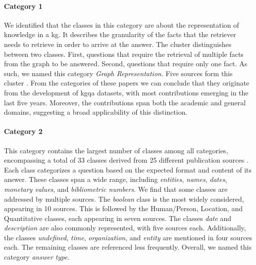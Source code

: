 \label{enum:cluster_1}
\paragraph{Category 1} We identified that the classes in this category are about the representation of knowledge in a \gls{kg}. It describes the granularity of the facts that the retriever needs to retrieve in order to arrive at the answer. The cluster distinguishes between two classes. First, questions that require the retrieval of multiple facts from the graph to be answered. Second, questions that require only one fact. As such, we named this category \emph{Graph Representation}. Five sources form this cluster \cite{banerjee_dblp-quad_2023,auer_sciqa_2023,dubey_lc-quad_2019,jaradeh_question_2020,bordes_large-scale_2015}. From the categories of these papers we can conclude that they originate from the development of \gls{kgqa} datasets, with most contributions emerging in the last five years. Moreover, the contributions span both the academic and general domains, suggesting a broad applicability of this distinction. 

\label{enum:cluster_2}
\paragraph{Category 2} This category contains the largest number of classes among all categories, encompassing a total of 33 classes derived from 25 different publication sources \cite{allam_question_2016,moldovan_structure_2000,steinmetz_what_2021,singhal_att_1999, dillon_classification_1984,riloff_rule-based_2000,taffa_hybrid-squad_2024,mikhailian_learning_2009,sjoberg_future_2007, nguyen_ripple_2017,chernov_linguistically_2015,li_learning_2002, shaw_writing_2003,bolotova_non-factoid_2022,banerjee_dblp-quad_2023,auer_sciqa_2023,dubey_lc-quad_2019,jaradeh_question_2020,tran_comparative_2022,easterbrook_selecting_2008,ratan_formulation_2019,kamper_types_2020,liu_taxonomy_2015,karras_divide_2023,thuan_construction_2019}. Each class categorizes a question based on the expected format and content of its answer. These classes span a wide range, including \emph{entities}, \emph{names}, \emph{dates}, \emph{monetary values}, and \emph{bibliometric numbers}. We find that some classes are addressed by multiple sources. The \emph{boolean} class is the most widely considered, appearing in 10 sources. This is followed by the Human/Person, Location, and Quantitative classes, each appearing in seven sources. The classes \emph{date} and \emph{description} are also commonly represented, with five sources each. Additionally, the classes \emph{undefined}, \emph{time}, \emph{organization}, and \emph{entity} are mentioned in four sources each. The remaining classes are referenced less frequently. Overall, we named this category \emph{answer type}.


